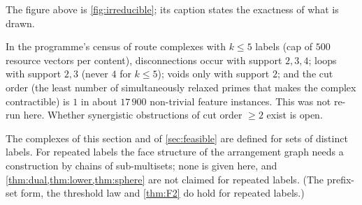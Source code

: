 \noindent The figure above is \cref{fig:irreducible}; its caption states the exactness of what is drawn.
\begin{proposition}\label{prop:supportcensus}
In the programme's census of route complexes with $k\le5$ labels (cap of $500$ resource vectors per content), disconnections occur with support $2,3,4$; loops with support $2,3$ (never $4$ for $k\le5$); voids only with support $2$; and the cut order (the least number of simultaneously relaxed primes that makes the complex contractible) is $1$ in about $17\,900$ non-trivial feature instances. This was not re-run here. Whether synergistic obstructions of cut order $\ge2$ exist is open.
\end{proposition}
\begin{problem}\label{prob:repeated}
The complexes of this section and of \cref{sec:feasible} are defined for sets of distinct labels. For repeated labels the face structure of the arrangement graph needs a construction by chains of sub-multisets; none is given here, and \cref{thm:dual,thm:lower,thm:sphere} are not claimed for repeated labels. (The prefix-set form, the threshold law and \cref{thm:F2} do hold for repeated labels.)
\end{problem}
